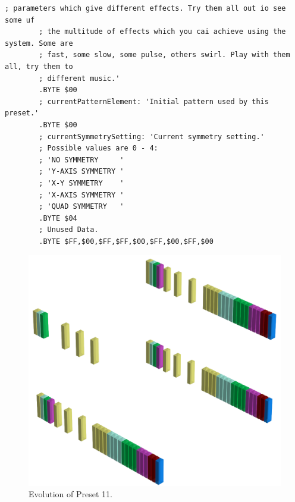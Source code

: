 \begin{lstlisting}[basicstyle=\tiny,caption=Source code for Preset 10.]
        ; parameters which give different effects. Try them all out io see some uf
        ; the multitude of effects which you cai achieve using the system. Some are
        ; fast, some slow, some pulse, others swirl. Play with them all, try them to
        ; different music.'
        .BYTE $00
        ; currentPatternElement: 'Initial pattern used by this preset.'
        .BYTE $00
        ; currentSymmetrySetting: 'Current symmetry setting.'
        ; Possible values are 0 - 4:
        ; 'NO SYMMETRY     '
        ; 'Y-AXIS SYMMETRY '
        ; 'X-Y SYMMETRY    '
        ; 'X-AXIS SYMMETRY '
        ; 'QUAD SYMMETRY   '
        .BYTE $04
        ; Unused Data.
        .BYTE $FF,$00,$FF,$FF,$00,$FF,$00,$FF,$00
\end{lstlisting}


\clearpage                                                                 
\begin{figure}[H]                                                          
    \centering                                                             
    \begin{adjustbox}{width=14cm,center}                                   
      \includegraphics[width=14cm]{src/presets/pattern10-45.png}%
    \end{adjustbox}                                                        
\caption{Evolution of Preset 11.}                                           
\end{figure}                                                               
\clearpage                                                                 
                                                                           
